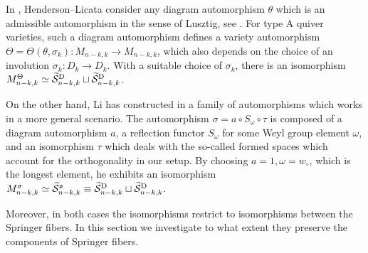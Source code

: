 \documentclass[11pt,reqno]{amsart}
\numberwithin{equation}{section}
\theoremstyle{definition}
\newcommand{\cS}{\mathcal{S}}
\newcommand{\tcS}{\widetilde{\cS}}
\newcommand{\tcSD}{\widetilde{\cS}^{\textup{D}}}
\begin{document}
In \cite{HL14}, Henderson--Licata consider any diagram automorphism $\theta$ which is an admissible automorphism in the sense of Lusztig, see \cite[\S 12.1.1]{L93}.
For type A quiver varieties, such a diagram automorphism defines a variety automorphism 
$\Theta = \Theta(\theta, \sigma_k): M_{n-k,k} \to M_{n-k,k}$,
which also depends on the choice of an involution $\sigma_k: D_k \to D_k$.
With a suitable choice of $\sigma_k$, there is an isomorphism $M^\Theta_{n-k,k} \simeq \tcSD_{n-k,k} \sqcup \tcSD_{n-k,k}$.

On the other hand, Li has constructed in \cite{Li19} a family of automorphisms which works in a more general scenario. The automorphism $\sigma = a \circ S_{\omega} \circ \tau$ is composed of a diagram automorphism $a$, a reflection functor $S_{\omega}$ for some Weyl group element $\omega$, and an isomorphism $\tau$ which deals with the so-called formed spaces which account for the orthogonality in our setup.
By choosing $a=1, \omega = w_\circ$, which is the longest element, he exhibits an isomorphism
$M^\sigma_{n-k,k} \simeq \tcS^{\mathfrak{o}}_{n-k,k} \equiv \tcSD_{n-k,k} \sqcup \tcSD_{n-k,k}$.

Moreover, in both cases the isomorphisms restrict to isomorphisms between the Springer fibers.
In this section we investigate to what extent they preserve the components of Springer fibers. 

\end{document}
